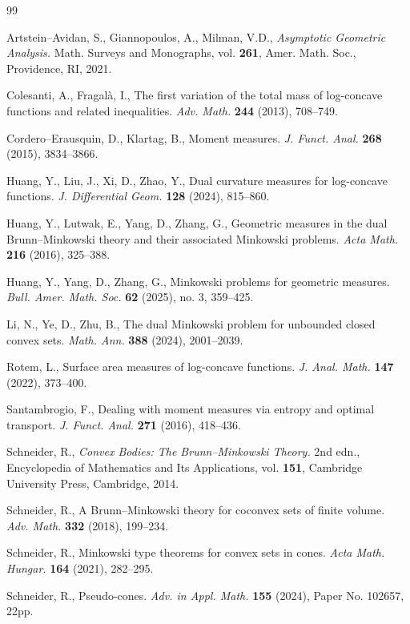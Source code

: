 \documentclass[12pt]{article}
\newcommand{\0}{\mbox{\boldmath$o$}}
\begin{document}
\begin{thebibliography}{99}

 Artstein--Avidan, S., Giannopoulos, A., Milman, V.D., {\it Asymptotic Geometric Analysis.} Math. Surveys and Monographs, vol. {\bf 261}, Amer. Math. Soc., Providence, RI, 2021.

 Colesanti, A., Fragal\`a, I., The first variation of the total mass of log-concave functions and related inequalities. {\em Adv. Math.} {\bf 244} (2013), 708--749.

 Cordero--Erausquin, D., Klartag, B., Moment measures. {\em J. Funct. Anal.} {\bf 268} (2015), 3834--3866.

 Huang, Y., Liu, J., Xi, D., Zhao, Y., Dual curvature measures for log-concave functions. {\em J. Differential Geom.} {\bf 128} (2024), 815--860.

 Huang, Y., Lutwak, E., Yang, D., Zhang, G., Geometric measures in the dual Brunn--Minkowski theory and their associated Minkowski problems. {\em Acta Math.} {\bf 216} (2016), 325--388.

 Huang, Y., Yang, D., Zhang, G., Minkowski problems for geometric measures. {\em Bull. Amer. Math. Soc.} {\bf 62} (2025), no. 3, 359--425.

 Li, N., Ye, D., Zhu, B., The dual Minkowski problem for unbounded closed convex sets. {\em Math. Ann.} {\bf 388} (2024), 2001--2039.

 Rotem, L., Surface area measures of log-concave functions. {\em J. Anal. Math.} {\bf 147} (2022), 373--400.

 Santambrogio, F., Dealing with moment measures via entropy and optimal transport. {\em J. Funct. Anal.} {\bf 271} (2016), 418--436.

 Schneider, R., {\it Convex Bodies: The Brunn--Minkowski Theory.} 2nd edn., Encyclopedia of Mathematics and Its Applications, vol. {\bf 151}, Cambridge University Press, Cambridge, 2014.

 Schneider, R., A Brunn--Minkowski theory for coconvex sets of finite volume. {\em Adv. Math.} {\bf 332} (2018), 199--234.

 Schneider, R., Minkowski type theorems for convex sets in cones. {\em Acta Math. Hungar.} {\bf 164} (2021), 282--295.

 Schneider, R., Pseudo-cones. {\em Adv. in Appl. Math.} {\bf 155} (2024), Paper No. 102657, 22pp.


\end{thebibliography}
\end{document}
